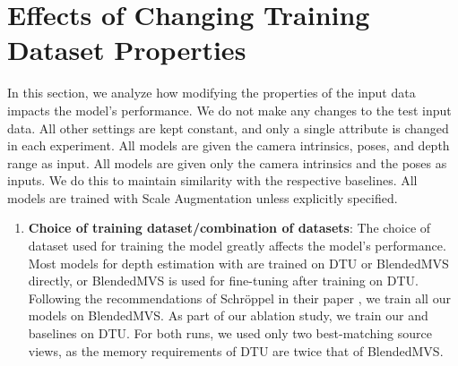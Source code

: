 \section{Effects of Changing Training Dataset Properties}\label{sec:exp-dataset-prop}
In this section, we analyze how modifying the properties of the input data impacts the model's performance. We do not make any changes to the test input data. All other settings are kept constant, and only a single attribute is changed in each experiment. All {\mvsn} models are given the camera intrinsics, poses, and depth range as input. All {\rmvd} models are given only the camera intrinsics and the poses as inputs. We do this to maintain similarity with the respective baselines. All {\rmvd} models are trained with Scale Augmentation unless explicitly specified. 

\begin{enumerate}
\item \textbf{Choice of training dataset/combination of datasets}:
The choice of dataset used for training the model greatly affects the model's performance. Most models for depth estimation with {\mvs} are trained on DTU or BlendedMVS directly, or BlendedMVS is used for fine-tuning after training on DTU. Following the recommendations of Schröppel {\etal} in their paper \cite{schroeppel2022benchmark}, we train all our models on BlendedMVS. As part of our ablation study, we train our {\mvsn} and {\rmvd} baselines on DTU. For both runs, we used only two best-matching source views, as the memory requirements of DTU are twice that of BlendedMVS. 


\end{enumerate}
